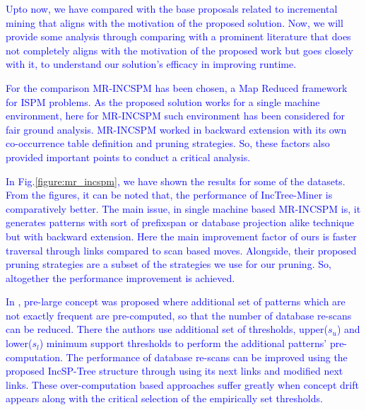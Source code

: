 \textcolor{blue}{Upto now, we have compared with the base proposals related to incremental mining that aligns with the motivation of the proposed solution. Now, we will provide some analysis through comparing with a prominent literature that does not completely aligns with the motivation of the proposed work but goes closely with it, to understand our solution's efficacy in improving runtime.}

\textcolor{blue}{For the comparison MR-INCSPM\cite{saleti2019mapreduce} has been chosen, a Map Reduced framework for ISPM problems. As the proposed solution works for a single machine environment, here for MR-INCSPM such environment has been considered for fair ground analysis. MR-INCSPM worked in backward extension with its own co-occurrence table definition and pruning strategies. So, these factors also provided important points to conduct a critical analysis.} 

\textcolor{blue}{In Fig.\ref{figure:mr_incspm}, we have shown the results for some of the datasets. From the figures, it can be noted that, the performance of IncTree-Miner is comparatively better. The main issue, in single machine based MR-INCSPM is, it generates patterns with sort of prefixspan or database projection alike technique but with backward extension. Here the main improvement factor of ours is faster traversal through links compared to scan based moves. Alongside, their proposed pruning strategies are a subset of the strategies we use for our pruning. So, altogether the performance improvement is achieved.}   

\textcolor{blue}{In \cite{lin2015incrementally}, pre-large concept was proposed where additional set of patterns which are not exactly frequent are pre-computed, so that the number of database re-scans can be reduced. There the authors use additional set of thresholds, upper($s_{u}$) and lower($s_{l}$) minimum support thresholds to perform the additional patterns' pre-computation. The performance of database re-scans can be improved using the proposed IncSP-Tree structure through using its next links and modified next links. These over-computation based approaches suffer greatly when concept drift appears along with the critical selection of the empirically set thresholds.} 

